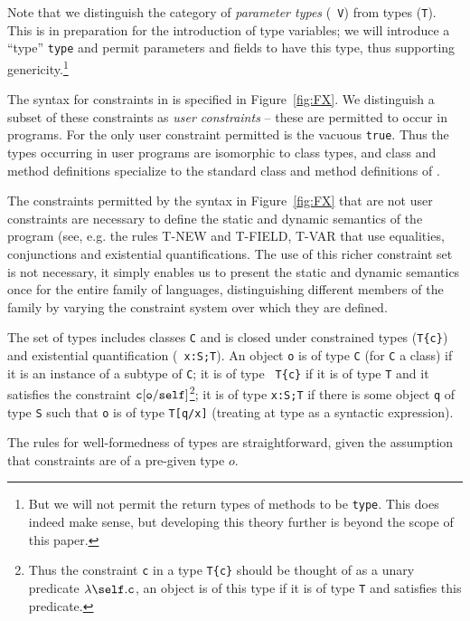 Note that we distinguish the category of {\em parameter types} ({\tt
V}) from types ({\tt T}). This is in preparation for the introduction
of type variables; we will introduce a ``type'' {\tt type} and permit
parameters and fields to have this type, thus supporting
genericity.\footnote{But we will not permit the return types of
methods to be {\tt type}. This does indeed make sense, but developing
this theory further is beyond the scope of this paper.}

The syntax for constraints in \FXZ{} is specified in
Figure~\ref{fig:FX}. We distinguish a subset of these constraints as
{\em user constraints} -- these are permitted to occur in
programs. For \FXZ{} the only user constraint permitted is the vacuous
{\tt true}. Thus the types occurring in user programs are isomorphic
to class types, and class and method definitions specialize to the
standard class and method definitions of \FJ{}. 

The constraints permitted by the syntax in Figure~\ref{fig:FX} that
are not user constraints are necessary to define the static and
dynamic semantics of the program (see, e.g.{} the rules {\sc T-NEW}
and {\sc T-FIELD}, {\sc T-VAR} that use equalities, conjunctions and
existential quantifications. The use of this richer constraint set is
not necessary, it simply enables us to present the static and dynamic
semantics once for the entire family of \FX{} languages,
distinguishing different members of the family by varying the
constraint system over which they are defined.

The set of types includes classes {\tt C} and is closed under
constrained types ({\tt T\{c\}}) and existential quantification ({\tt
x:S;T}). An object {\tt o} is of type {\tt C} (for {\tt C} a class)
if it is an instance of a subtype of {\tt C}; it is of type {\tt
T\{c\}} if it is of type {\tt T} and it satisfies the constraint $\tt
c[o/self]$\footnote{Thus the constraint {\tt c} in a type {\tt T\{c\}}
should be thought of as a unary predicate $\lambda\self.{\tt c}$, an
object is of this type if it is of type {\tt T} and satisfies this
predicate.}; it is of type {\tt x:S;T} if there is some object {\tt q}
of type {\tt S} such that {\tt o} is of type {\tt T[q/x]} (treating at
type as a syntactic expression).

The rules for well-formedness of types are straightforward, given 
the assumption that constraints are of a pre-given type $o$.

